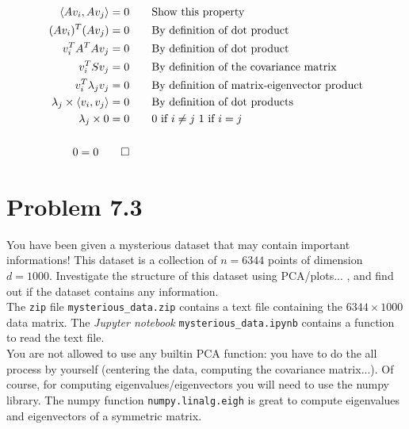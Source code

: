 \documentclass[12pt,twoside]{article}
\begin{document}
\begin{equation}
    \begin{split}
         \langle Av_i, Av_j \rangle = 0 & \qquad \text{Show this property} \\
        (Av_i)^T(Av_j) = 0 &  \qquad \text{By definition of dot product} \\
        v_i^TA^TAv_j = 0 & \qquad \text{By definition of dot product} \\
        v_i^TSv_j =0 & \qquad \text{By definition of the covariance matrix} \\
        v_i^T \lambda_j v_j =0  & \qquad \text{By definition of matrix-eigenvector product} \\
        \lambda_j \times \langle v_i,  v_j\rangle =0 & \qquad \text{By definition of dot products} \\
        \lambda_j \times 0 =0 & \qquad \text{0 if $i \neq j$ 1 if $i =j$} \\\\
        0 = 0 \qed
    \end{split}
\end{equation}



\section{Problem 7.3}
	You have been given a mysterious dataset that may contain important informations! This dataset is a collection of $n=6344$ points of dimension $d=1000$.
	Investigate the structure of this dataset using PCA/plots... , and find out if the dataset contains any information.
	\\

	The \texttt{zip} file \texttt{mysterious\_data.zip} contains a text file containing the $6344\times 1000$ data matrix.
	The \emph{Jupyter notebook} \texttt{mysterious\_data.ipynb} contains a function to read the text file.
\\

	You are not allowed to use any builtin PCA function: you have to do the all process by yourself (centering the data, computing the covariance matrix...). Of course, for computing eigenvalues/eigenvectors you will need to use the numpy library.
	The numpy function \texttt{numpy.linalg.eigh} is great to compute eigenvalues and eigenvectors of a symmetric matrix. 
	\\
\end{document}
